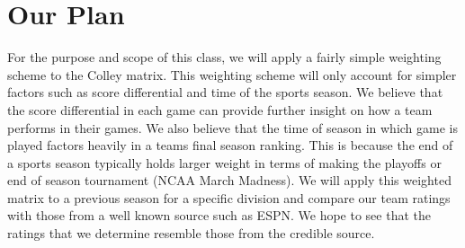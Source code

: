 \documentclass{article}
\begin{document}
\section{Our Plan}
For the purpose and scope of this class, we will apply a fairly simple weighting scheme to the Colley matrix. This weighting scheme will only account for simpler factors such as score differential and time of the sports season. We believe that the score differential in each game can provide further insight on how a team performs in their games. We also believe that the time of season in which game is played factors heavily in a teams final season ranking. This is because the end of a sports season typically holds larger weight in terms of making the playoffs or end of season tournament (NCAA March Madness). We will apply this weighted matrix to a previous season for a specific division and compare our team ratings with those from a well known source such as ESPN. We hope to see that the ratings that we determine resemble those from the credible source.
\end{document}
